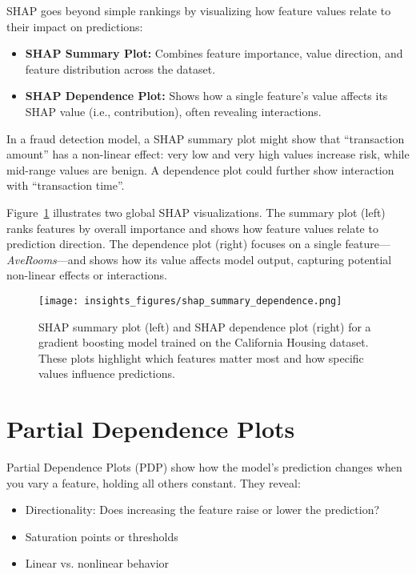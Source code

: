 \documentclass[12pt,openany]{book}
\begin{document}
SHAP goes beyond simple rankings by visualizing how feature values relate to their impact on predictions:

\begin{itemize}
  \item \textbf{SHAP Summary Plot:} Combines feature importance, value direction, and feature distribution across the dataset.
  \item \textbf{SHAP Dependence Plot:} Shows how a single feature’s value affects its SHAP value (i.e., contribution), often revealing interactions.
\end{itemize}

\begin{examplebox}
In a fraud detection model, a SHAP summary plot might show that ``transaction amount'' has a non-linear effect: very low and very high values increase risk, while mid-range values are benign. A dependence plot could further show interaction with ``transaction time''.
\end{examplebox}


Figure~\ref{fig:shap-summary-dependence} illustrates two global SHAP visualizations. The summary plot (left) ranks features by overall importance and shows how feature values relate to prediction direction. The dependence plot (right) focuses on a single feature—\textit{AveRooms}—and shows how its value affects model output, capturing potential non-linear effects or interactions.

\begin{figure}[H]
    \centering
    \texttt{[image: insights\_figures/shap\_summary\_dependence.png]}
    \caption{SHAP summary plot (left) and SHAP dependence plot (right) for a gradient boosting model trained on the California Housing dataset. These plots highlight which features matter most and how specific values influence predictions.}
    \label{fig:shap-summary-dependence}
\end{figure}




\section{Partial Dependence Plots }

Partial Dependence Plots (PDP) show how the model's prediction changes when you vary a feature, holding all others constant. They reveal:
\begin{itemize}
  \item Directionality: Does increasing the feature raise or lower the prediction?
  \item Saturation points or thresholds
  \item Linear vs. nonlinear behavior
\end{itemize}
\end{document}
